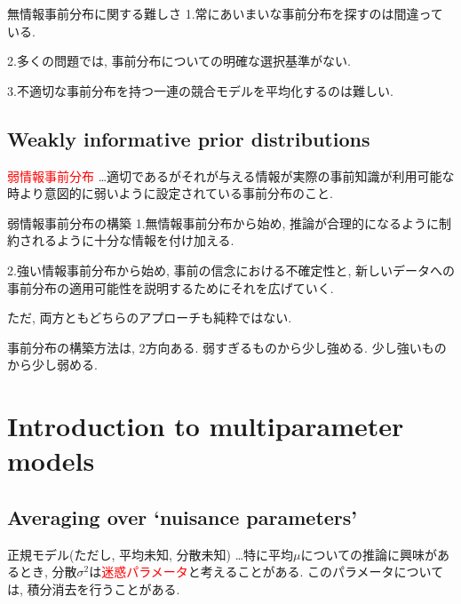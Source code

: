 \documentclass[11pt,a4pape,dvipdfmx]{jarticle}
\newcommand{\tcr}[1]{\textcolor{red}{#1}}
\begin{document}
\begin{itembox}[l]{無情報事前分布に関する難しさ}
1.常にあいまいな事前分布を探すのは間違っている.

2.多くの問題では, 事前分布についての明確な選択基準がない.

3.不適切な事前分布を持つ一連の競合モデルを平均化するのは難しい.
\end{itembox}



\subsection{Weakly informative prior distributions}
\begin{itembox}[l]{\tcr{弱情報事前分布}}
…適切であるがそれが与える情報が実際の事前知識が利用可能な時より意図的に弱いように設定されている事前分布のこと.
\end{itembox}


\begin{itembox}[l]{弱情報事前分布の構築}
1.無情報事前分布から始め, 推論が合理的になるように制約されるように十分な情報を付け加える.

2.強い情報事前分布から始め, 事前の信念における不確定性と, 新しいデータへの事前分布の適用可能性を説明するためにそれを広げていく.

ただ, 両方ともどちらのアプローチも純粋ではない.
\end{itembox}

事前分布の構築方法は, 2方向ある.
弱すぎるものから少し強める.
少し強いものから少し弱める.


\section{Introduction to multiparameter models}

\subsection{Averaging over ‘nuisance parameters’}
\begin{itembox}[l]{正規モデル(ただし, 平均未知, 分散未知)}
…特に平均$\mu$についての推論に興味があるとき, 分散$\sigma^2$は\tcr{迷惑パラメータ}と考えることがある.
このパラメータについては, 積分消去を行うことがある.
\end{itembox}
\end{document}
